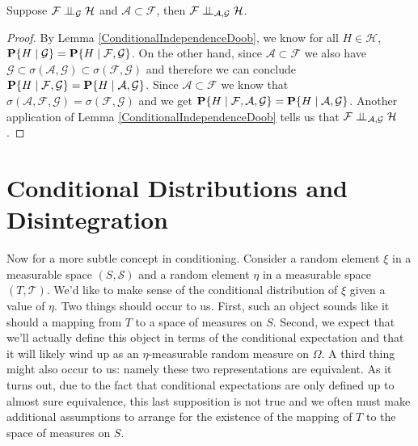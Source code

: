 \begin{lem}Suppose $\cindependent{\mathcal{F}}{\mathcal{H}}{\mathcal{G}}$ and $\mathcal{A} \subset \mathcal{F}$,
  then $\cindependent{\mathcal{F}}{\mathcal{H}}{\mathcal{A},\mathcal{G}}$.
\end{lem}
\begin{proof}
By Lemma \ref{ConditionalIndependenceDoob}, we know for all $H \in
\mathcal{H}$, 
$\cprobability{\mathcal{G}}{H} =
\cprobability{\mathcal{F},\mathcal{G}}{H}$. On the other hand, since
$\mathcal{A} \subset \mathcal{F}$ we also have $\mathcal{G} \subset
\sigma(\mathcal{A}, \mathcal{G}) \subset \sigma(\mathcal{F},
\mathcal{G})$ and therefore we can conclude
$\cprobability{\mathcal{F},\mathcal{G}}{H} = \cprobability{\mathcal{A},\mathcal{G}}{H}$.
Since $\mathcal{A} \subset \mathcal{F}$ we know that $\sigma(\mathcal{A},
\mathcal{F}, \mathcal{G}) = \sigma(\mathcal{F}, \mathcal{G})$ and we
get $\cprobability{\mathcal{F},\mathcal{A},\mathcal{G}}{H} =
\cprobability{\mathcal{A},\mathcal{G}}{H}$.
Another application of Lemma \ref{ConditionalIndependenceDoob} tells
us that $\cindependent{\mathcal{F}}{\mathcal{H}}{\mathcal{A},\mathcal{G}}$.
\end{proof}

\section{Conditional Distributions and Disintegration}
Now for a more subtle concept in conditioning.  Consider a random
element $\xi$ in a measurable space $(S,\mathcal{S})$ and a random
element $\eta$ in a measurable space $(T,\mathcal{T})$.  We'd like to
make sense of the conditional distribution of $\xi$ given a value of
$\eta$.  Two things should occur to us.  First, such an object sounds
like it should a mapping from $T$ to a space of measures on $S$.  Second, we
expect that we'll actually define this object in terms of the
conditional expectation and that it will likely wind up as an
$\eta$-measurable random measure on $\Omega$.  A third thing might also
occur to us: namely these two representations are equivalent.  As it
turns out, due to the fact that conditional expectations are only
defined up to almost sure equivalence, this last supposition is not true and we often must make
additional assumptions to arrange for the existence of the mapping of
$T$ to the space of measures on $S$. 

